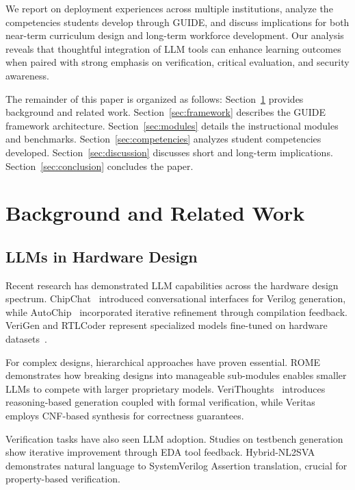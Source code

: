 \documentclass[10pt,conference]{IEEEtran}
\begin{document}
We report on deployment experiences across multiple institutions, analyze the competencies students develop through GUIDE, and discuss implications for both near-term curriculum design and long-term workforce development. Our analysis reveals that thoughtful integration of LLM tools can enhance learning outcomes when paired with strong emphasis on verification, critical evaluation, and security awareness.

The remainder of this paper is organized as follows: Section~\ref{sec:background} provides background and related work. Section~\ref{sec:framework} describes the GUIDE framework architecture. Section~\ref{sec:modules} details the instructional modules and benchmarks. Section~\ref{sec:competencies} analyzes student competencies developed. Section~\ref{sec:discussion} discusses short and long-term implications. Section~\ref{sec:conclusion} concludes the paper.

\section{Background and Related Work}
\label{sec:background}

\subsection{LLMs in Hardware Design}

Recent research has demonstrated LLM capabilities across the hardware design spectrum. ChipChat~\cite{chipchat} introduced conversational interfaces for Verilog generation, while AutoChip~\cite{autochip} incorporated iterative refinement through compilation feedback. VeriGen and RTLCoder represent specialized models fine-tuned on hardware datasets~\cite{thakur2023verigen,rtlcoder}.

For complex designs, hierarchical approaches have proven essential. ROME~\cite{rome} demonstrates how breaking designs into manageable sub-modules enables smaller LLMs to compete with larger proprietary models. VeriThoughts~\cite{verithoughts} introduces reasoning-based generation coupled with formal verification, while Veritas~\cite{veritas} employs CNF-based synthesis for correctness guarantees.

Verification tasks have also seen LLM adoption. Studies on testbench generation~\cite{testbench-fsm} show iterative improvement through EDA tool feedback. Hybrid-NL2SVA~\cite{hybrid-nl2sva} demonstrates natural language to SystemVerilog Assertion translation, crucial for property-based verification.
\end{document}
